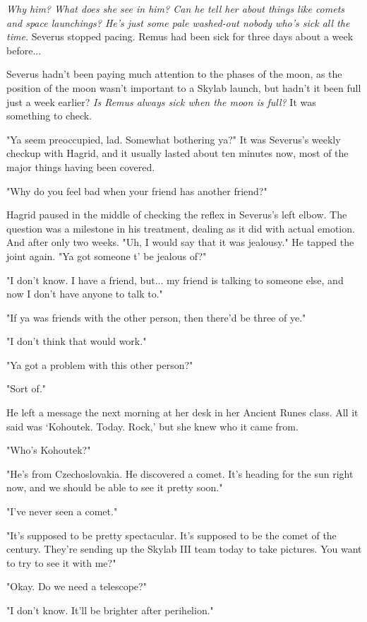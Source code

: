 \emph{Why him? What does she see in him? Can he tell her about things like comets and space launchings? He's just some pale washed-out nobody who's sick all the time.} Severus stopped pacing. Remus had been sick for three days about a week before...

Severus hadn't been paying much attention to the phases of the moon, as the position of the moon wasn't important to a Skylab launch, but hadn't it been full just a week earlier? \emph{Is Remus always sick when the moon is full?} It was something to check.

"Ya seem preoccupied, lad. Somewhat bothering ya?" It was Severus's weekly checkup with Hagrid, and it usually lasted about ten minutes now, most of the major things having been covered.

"Why do you feel bad when your friend has another friend?"

Hagrid paused in the middle of checking the reflex in Severus's left elbow. The question was a milestone in his treatment, dealing as it did with actual emotion. And after only two weeks. "Uh, I would say that it was jealousy." He tapped the joint again. "Ya got someone t' be jealous of?"

"I don't know. I have a friend, but... my friend is talking to someone else, and now I don't have anyone to talk to."

"If ya was friends with the other person, then there'd be three of ye."

"I don't think that would work."

"Ya got a problem with this other person?"

"Sort of."

He left a message the next morning at her desk in her Ancient Runes class. All it said was `Kohoutek. Today. Rock,' but she knew who it came from.

"Who's Kohoutek?"

"He's from Czechoslovakia. He discovered a comet. It's heading for the sun right now, and we should be able to see it pretty soon."

"I've never seen a comet."

"It's supposed to be pretty spectacular. It's supposed to be the comet of the century. They're sending up the Skylab III team today to take pictures. You want to try to see it with me?"

"Okay. Do we need a telescope?"

"I don't know. It'll be brighter after perihelion."

